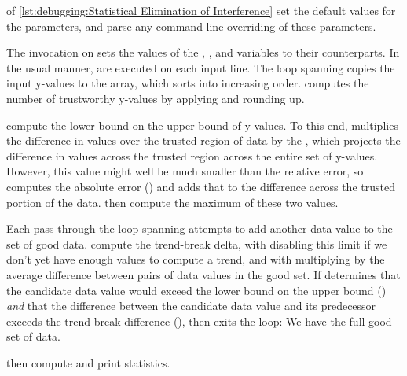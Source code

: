 \begin{fcvref}
 of
\cref{lst:debugging:Statistical Elimination of Interference}
set the default values for the parameters, and
 parse
any command-line overriding of these parameters.
\end{fcvref}
\begin{fcvref}
The  invocation on  sets the values of the
, , and  variables to their
 counterparts.
In the usual  manner,
 are executed on each input
line.
The loop spanning  copies
the input y-values to the
 array, which  sorts into increasing order.
 computes the number of trustworthy y-values
by applying  and rounding up.

 compute the 
lower bound on the upper bound of y-values.
To this end,  multiplies the difference in values over
the trusted region of data by the , which projects the
difference in values across the trusted region across the entire
set of y-values.
However, this value might well be much smaller than the relative error,
so  computes the absolute error ()
and adds
that to the difference  across the trusted portion of the data.
 then compute the maximum of
these two values.

Each pass through the loop spanning 
attempts to add another
data value to the set of good data.
 compute the trend-break delta,
with  disabling this
limit if we don't yet have enough values to compute a trend,
and with  multiplying  by the average
difference between pairs of data values in the good set.
If  determines that the candidate data value would exceed the
lower bound on the upper bound () \emph{and}
that the difference between the candidate data value
and its predecessor exceeds the trend-break difference (),
then  exits the loop:
We have the full good set of data.

 then compute and print
statistics.
\end{fcvref}

